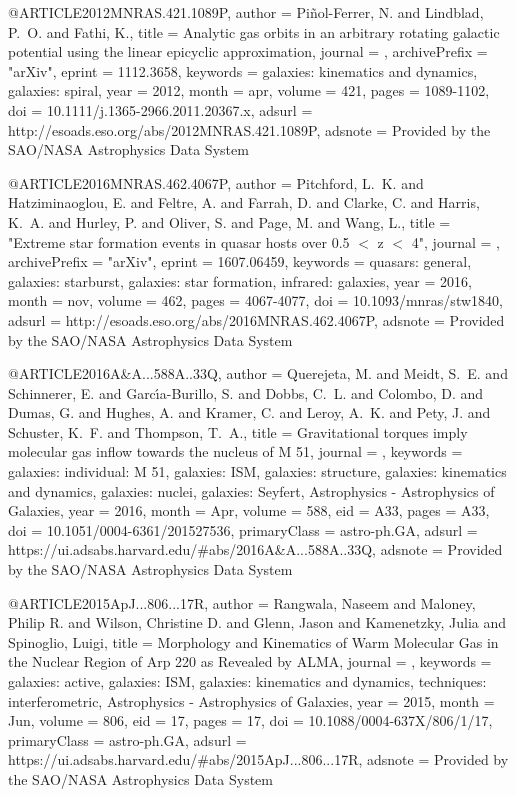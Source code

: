 \documentclass[longauth]{aa}
\begin{document}
{{{@ARTICLE{2012MNRAS.421.1089P,
   author = {{Pi{\~n}ol-Ferrer}, N. and {Lindblad}, P.~O. and {Fathi}, K.},
    title = {Analytic gas orbits in an arbitrary rotating galactic potential using the linear epicyclic approximation},
  journal = {\mnras},
archivePrefix = "arXiv",
   eprint = {1112.3658},
 keywords = {galaxies: kinematics and dynamics, galaxies: spiral},
     year = 2012,
    month = apr,
   volume = 421,
    pages = {1089-1102},
      doi = {10.1111/j.1365-2966.2011.20367.x},
   adsurl = {http://esoads.eso.org/abs/2012MNRAS.421.1089P},
  adsnote = {Provided by the SAO/NASA Astrophysics Data System}
}

@ARTICLE{2016MNRAS.462.4067P,
   author = {{Pitchford}, L.~K. and {Hatziminaoglou}, E. and {Feltre}, A. and 
	{Farrah}, D. and {Clarke}, C. and {Harris}, K.~A. and {Hurley}, P. and 
	{Oliver}, S. and {Page}, M. and {Wang}, L.},
    title = "{Extreme star formation events in quasar hosts over 0.5 $\lt$ z $\lt$ 4}",
  journal = {\mnras},
archivePrefix = "arXiv",
   eprint = {1607.06459},
 keywords = {quasars: general, galaxies: starburst, galaxies: star formation, infrared: galaxies},
     year = 2016,
    month = nov,
   volume = 462,
    pages = {4067-4077},
      doi = {10.1093/mnras/stw1840},
   adsurl = {http://esoads.eso.org/abs/2016MNRAS.462.4067P},
  adsnote = {Provided by the SAO/NASA Astrophysics Data System}
}

@ARTICLE{2016A&A...588A..33Q,
       author = {{Querejeta}, M. and {Meidt}, S.~E. and {Schinnerer}, E. and {Garc{\'\i}a-Burillo}, S. and {Dobbs}, C.~L. and {Colombo}, D. and {Dumas}, G. and {Hughes}, A. and {Kramer}, C. and {Leroy}, A.~K. and {Pety}, J. and {Schuster}, K.~F. and {Thompson}, T.~A.},
        title = {Gravitational torques imply molecular gas inflow towards the nucleus of M 51},
      journal = {\aap},
     keywords = {galaxies: individual: M 51, galaxies: ISM, galaxies: structure,
        galaxies: kinematics and dynamics, galaxies: nuclei, galaxies:
        Seyfert, Astrophysics - Astrophysics of Galaxies},
         year = 2016,
        month = Apr,
       volume = {588},
          eid = {A33},
        pages = {A33},
          doi = {10.1051/0004-6361/201527536},
 primaryClass = {astro-ph.GA},
       adsurl = {https://ui.adsabs.harvard.edu/#abs/2016A&A...588A..33Q},
      adsnote = {Provided by the SAO/NASA Astrophysics Data System}
}

@ARTICLE{2015ApJ...806...17R,
       author = {{Rangwala}, Naseem and {Maloney}, Philip R. and {Wilson}, Christine D. and {Glenn}, Jason and {Kamenetzky}, Julia and {Spinoglio}, Luigi},
        title = {Morphology and Kinematics of Warm Molecular Gas in the Nuclear Region of Arp 220 as Revealed by ALMA},
      journal = {\apj},
     keywords = {galaxies: active, galaxies: ISM, galaxies: kinematics and dynamics, techniques: interferometric, Astrophysics - Astrophysics of Galaxies},
         year = 2015,
        month = Jun,
       volume = {806},
          eid = {17},
        pages = {17},
          doi = {10.1088/0004-637X/806/1/17},
 primaryClass = {astro-ph.GA},
       adsurl = {https://ui.adsabs.harvard.edu/#abs/2015ApJ...806...17R},
      adsnote = {Provided by the SAO/NASA Astrophysics Data System}
}

}}}
\end{document}
